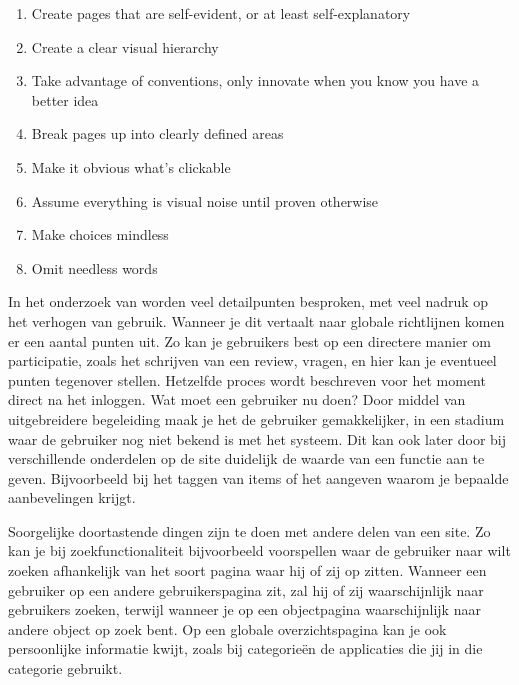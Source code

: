 \documentclass[a4paper, 10pt, pdftex]{report}
\begin{document}
      \begin{enumerate}
        \item Create pages that are self-evident, or at least self-explanatory
        \item Create a clear visual hierarchy
        \item Take advantage of conventions, only innovate when you know you have a better idea
        \item Break pages up into clearly defined areas
        \item Make it obvious what's clickable
        \item Assume everything is visual noise until proven otherwise
        \item Make choices mindless
        \item Omit needless words
      \end{enumerate}

    In het onderzoek van \citeauthor{Alfrink2008} worden veel detailpunten besproken, met veel nadruk op het verhogen van gebruik. Wanneer je dit vertaalt naar globale richtlijnen komen er een aantal punten uit. Zo kan je gebruikers best op een directere manier om participatie, zoals het schrijven van een review, vragen, en hier kan je eventueel punten tegenover stellen. Hetzelfde proces wordt beschreven voor het moment direct na het inloggen. Wat moet een gebruiker nu doen? Door middel van uitgebreidere begeleiding maak je het de gebruiker gemakkelijker, in een stadium waar de gebruiker nog niet bekend is met het systeem. Dit kan ook later door bij verschillende onderdelen op de site duidelijk de waarde van een functie aan te geven. Bijvoorbeeld bij het taggen van items of het aangeven waarom je bepaalde aanbevelingen krijgt.

    Soorgelijke doortastende dingen zijn te doen met andere delen van een site. Zo kan je bij zoekfunctionaliteit bijvoorbeeld voorspellen waar de gebruiker naar wilt zoeken afhankelijk van het soort pagina waar hij of zij op zitten. Wanneer een gebruiker op een andere gebruikerspagina zit, zal hij of zij waarschijnlijk naar gebruikers zoeken, terwijl wanneer je op een objectpagina waarschijnlijk naar andere object op zoek bent. Op een globale overzichtspagina kan je ook persoonlijke informatie kwijt, zoals bij categorie\"en de applicaties die jij in die categorie gebruikt.
\end{document}
